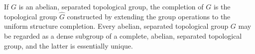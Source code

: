 If $G$ is an abelian, separated topological group, the completion of $G$ is the topological group $\hat{G}$ constructed by extending the group operations to the uniform structure completion. Every abelian, separated topological group $G$ may be regarded as a dense subgroup of a complete, abelian, separated topological group, and the latter is essentially unique.